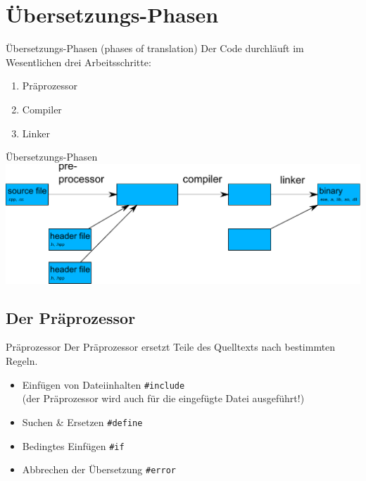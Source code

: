 \section{Übersetzungs-Phasen}


\begin{frame}{Übersetzungs-Phasen (phases of translation)}
	Der Code durchläuft im Wesentlichen drei Arbeitsschritte:
	
	\begin{enumerate}
		\item Präprozessor
		\item Compiler
		\item Linker
	\end{enumerate}
\end{frame}

\begin{frame}[fragile]{Übersetzungs-Phasen}
	\includegraphics[width=\textwidth]{images/translation-simple}
\end{frame}

\subsection{Der Präprozessor}

\begin{frame}[fragile]{Präprozessor}
	Der Präprozessor ersetzt Teile des Quelltexts nach bestimmten Regeln.
	
	\vspace{2em}
	
	\begin{itemize}
		\item Einfügen von Dateiinhalten \verb|#include| \\
		      (der Präprozessor wird auch für die eingefügte Datei ausgeführt!)
		\item Suchen \& Ersetzen \verb|#define|
		\item Bedingtes Einfügen \verb|#if|
		\item Abbrechen der Übersetzung \verb|#error|
	\end{itemize}
\end{frame}

